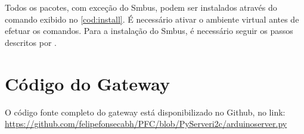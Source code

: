 			Todos os pacotes, com exceção do Smbus, podem ser instalados através do comando exibido no \autoref{cod:install}. É necessário ativar o ambiente virtual antes de efetuar os comandos. Para a instalação do Smbus, é necessário seguir os passos descritos por \textcite{dipto2015}. 
			
		
		
		\section{Código do Gateway}
			O código fonte completo do gateway está disponibilizado no Github, no link: \url{https://github.com/felipefonsecabh/PFC/blob/PyServeri2c/arduinoserver.py}
			
			
			
			
			
